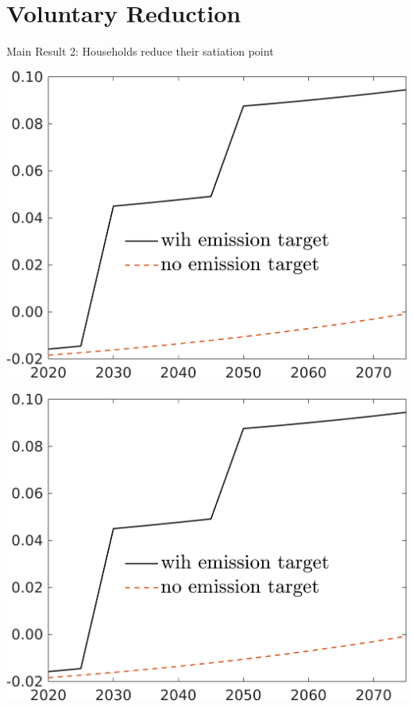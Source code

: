 \documentclass[11pt,aspectratio=169]{beamer}
\begin{document}
\section*{Voluntary Reduction}
\begin{frame}{Main Result 2: Households reduce their satiation point}
	\centering
	\begin{minipage}[]{0.32\textwidth}
		\includegraphics[width=1\textwidth]{../codding_model/own_basedOnFried/optimalPol_elastS_DisuSci/figures/all_1705/taul_TargetCompOPT_T_NoTaus_spillover0_sep1_BN1_ineq0_red1_etaa0.79_lgd1.png}
	\end{minipage}
\begin{minipage}[]{0.32\textwidth}
	\includegraphics[width=1\textwidth]{../codding_model/own_basedOnFried/optimalPol_elastS_DisuSci/figures/all_1705/taul_TargetCompOPT_T_NoTaus_spillover0_sep1_BN1_ineq0_red1_etaa0.79_lgd1.png}
\end{minipage}
\end{frame}
\end{document}
